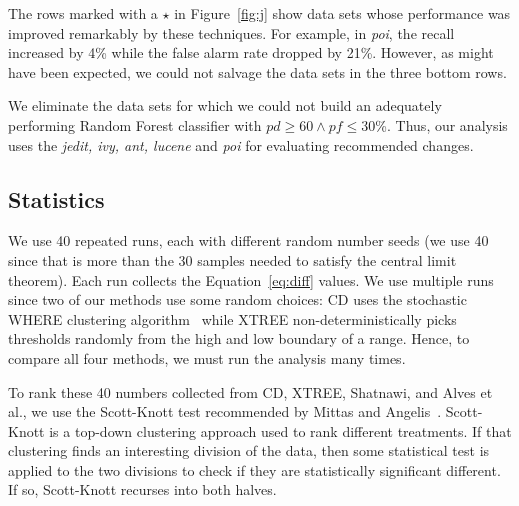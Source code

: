 \documentclass[twocolumn,5p]{elsarticle}
\newcommand{\fig}[1]{Figure~\ref{fig:#1}}
\newcommand{\eq}[1]{Equation~\ref{eq:#1}}
\theoremstyle{break}
\begin{document}
\begin{itemize}
The rows \colorbox{celadon}{marked with a $\star$} in \fig{j} show data sets whose performance was improved remarkably by these techniques. For example, in {\em poi}, the recall increased by 4\% while the false alarm rate dropped by 21\%. However, as might have been expected, we could not salvage the data sets in the  three bottom rows.

We eliminate the data sets for which we could not build an adequately performing Random Forest classifier with $\mathit{pd}\ge 60 \wedge \mathit{pf} \le 30$\%. Thus, our analysis uses the {\em jedit, ivy, ant, lucene} and {\em poi} for evaluating recommended changes.




\subsection{Statistics}


We use 40 repeated runs, each with different random number seeds (we use 40 since that is  more than the 30 samples  needed to satisfy the central limit theorem). Each run collects the \eq{diff} values.
We use multiple runs since two of our methods use some random choices: CD uses the  stochastic WHERE clustering algorithm~\cite{localvsglobal}
while XTREE non-deterministically picks thresholds randomly from
the high and low boundary of a range. 
 Hence, to compare all
four methods, we must run the analysis many times. 





To rank these 40 numbers collected from CD, XTREE, Shatnawi, and Alves et al., we use the Scott-Knott test recommended by Mittas and Angelis~\cite{mittas13}. 
Scott-Knott is a top-down clustering approach used to rank different
treatments. If that clustering finds an interesting division of the data, then
some statistical test is applied to the two divisions to check if they
are statistically significant different. If so, Scott-Knott recurses
into both halves.


\end{itemize}
\end{document}
